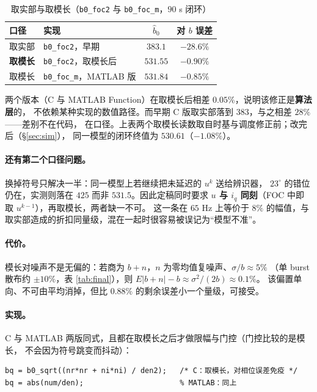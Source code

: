 \documentclass[11pt,a4paper]{ctexart}
\begin{document}
\begin{table}[H]
\centering
\caption{取实部与取模长（\texttt{b0\_foc2} 与 \texttt{b0\_foc\_m}，$90$ s 闭环）}
\label{tab:mag}
\begin{tabular}{llcc}
\toprule
口径 & 实现 & $\hat b_0$ & 对 $b$ 误差\\
\midrule
取实部 & \texttt{b0\_foc2}，早期 & $383.1$ & $-28.6\%$\\
\textbf{取模长} & \texttt{b0\_foc2}，取模长后 & $\bm{531.55}$ & $\bm{-0.90\%}$\\
取模长 & \texttt{b0\_foc\_m}，MATLAB 版 & $531.84$ & $-0.85\%$\\
\bottomrule
\end{tabular}
\end{table}

两个版本（C 与 MATLAB Function）在取模长后相差 $0.05\%$，说明该修正是\textbf{算法层}的，
不依赖某种实现的数值路径。而早期 C 版取实部落到 $383$，与之相差 $28\%$——差别不在代码，
在口径。上表两个取模长读数取自时基与调度修正前；改完后（\S\ref{sec:sim}），
同一模型的闭环终值为 $530.61$（$-1.08\%$）。

\paragraph{还有第二个口径问题。}换掉符号只解决一半：同一模型上若继续把未延迟的 $u^k$ 送给辨识器，
$23^\circ$ 的错位仍在，实测则落在 $425$ 而非 $531.5$。因此定稿同时要求
\textbf{$u$ 与 $i_q$ 同刻}（FOC 中即取 $u^{k-1}$），再取模长，两者缺一不可。
这一条在 $65$ Hz 上等价于 $8\%$ 的幅值，与取实部造成的折扣同量级，混在一起时很容易被误记为“模型不准”。

\paragraph{代价。}模长对噪声不是无偏的：若商为 $b+n$，$n$ 为零均值复噪声、$\sigma/b\approx5\%$
（单 burst 散布约 $\pm10\%$，表 \ref{tab:final}），则 $E|b+n|-b\approx\sigma^2/(2b)\approx0.1\%$。
该偏置单向、不可由平均消掉，但比 $0.88\%$ 的剩余误差小一个量级，可接受。

\paragraph{实现。}C 与 MATLAB 两版同式，且都在取模长之后才做限幅与门控（门控比较的是模长，
不会因为符号跳变而抖动）：

\begin{verbatim}
bq = b0_sqrt((nr*nr + ni*ni) / den2);   /* C：取模长，对相位误差免疫 */
bq = abs(num/den);                      % MATLAB：同上
\end{verbatim}
\end{document}
